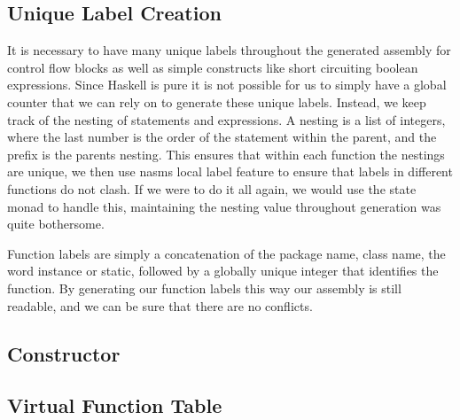 \documentclass[12pt,letterpaper]{article}
\begin{document}
\subsection{Unique Label Creation}
It is necessary to have many unique labels throughout the generated assembly for control flow blocks as well as simple constructs like short circuiting boolean expressions.
Since Haskell is pure it is not possible for us to simply have a global counter that we can rely on to generate these unique labels.
Instead, we keep track of the nesting of statements and expressions.
A nesting is a list of integers, where the last number is the order of the statement within the parent, and the prefix is the parents nesting.
This ensures that within each function the nestings are unique, we then use nasms local label feature to ensure that labels in different functions do not clash.
If we were to do it all again, we would use the state monad to handle this, maintaining the nesting value throughout generation was quite bothersome.

Function labels are simply a concatenation of the package name, class name, the word instance or static, followed by a globally unique integer that identifies the function.
By generating our function labels this way our assembly is still readable, and we can be sure that there are no conflicts.


\subsection{Constructor}

\subsection{Virtual Function Table}
\end{document}
